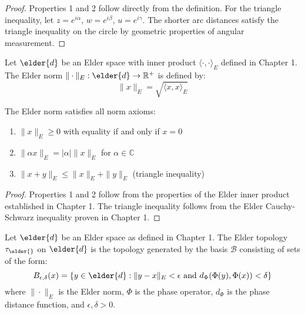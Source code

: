 \begin{proof}
Properties 1 and 2 follow directly from the definition. For the triangle inequality, let $z = e^{i\alpha}$, $w = e^{i\beta}$, $u = e^{i\gamma}$. The shorter arc distances satisfy the triangle inequality on the circle by geometric properties of angular measurement.
\end{proof}

\begin{definition}
Let $\elder{d}$ be an Elder space with inner product $\langle \cdot, \cdot \rangle_E$ defined in Chapter 1. The Elder norm $\|\cdot\|_E: \elder{d} \rightarrow \mathbb{R}^+$ is defined by:
\begin{equation}
\|x\|_E = \sqrt{\langle x, x \rangle_E}
\end{equation}
\end{definition}

\begin{proposition}
The Elder norm satisfies all norm axioms:
\begin{enumerate}
    \item $\|x\|_E \geq 0$ with equality if and only if $x = 0$
    \item $\|\alpha x\|_E = |\alpha| \|x\|_E$ for $\alpha \in \mathbb{C}$
    \item $\|x + y\|_E \leq \|x\|_E + \|y\|_E$ (triangle inequality)
\end{enumerate}
\end{proposition}

\begin{proof}
Properties 1 and 2 follow from the properties of the Elder inner product established in Chapter 1. The triangle inequality follows from the Elder Cauchy-Schwarz inequality proven in Chapter 1.
\end{proof}

\begin{definition}
Let $\elder{d}$ be an Elder space as defined in Chapter 1. The Elder topology $\tau_{\elder{}}$ on $\elder{d}$ is the topology generated by the basis $\mathcal{B}$ consisting of sets of the form:
\begin{equation}
B_{\epsilon, \delta}(x) = \{y \in \elder{d} : \|y - x\|_E < \epsilon \text{ and } d_{\Phi}(\Phi(y), \Phi(x)) < \delta\}
\end{equation}
where $\|\cdot\|_E$ is the Elder norm, $\Phi$ is the phase operator, $d_{\Phi}$ is the phase distance function, and $\epsilon, \delta > 0$.
\end{definition}

